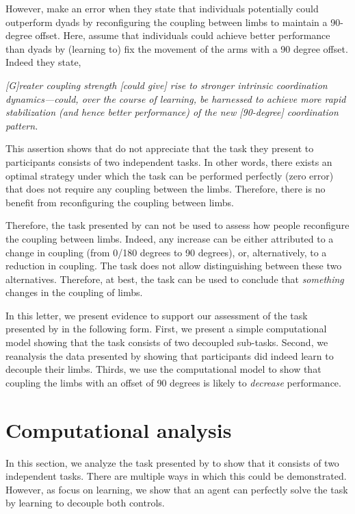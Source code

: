\documentclass[]{article}
\begin{document}
However, \citet{Annand2020} make an error when they state that individuals potentially could outperform dyads by reconfiguring the coupling between limbs to maintain a 90-degree offset. Here, \citet{Annand2020} assume that individuals could achieve better performance than dyads by (learning to) fix the movement of the arms with a 90 degree offset. Indeed they state,

\noindent\textit{[G]reater coupling strength [could give] rise to stronger intrinsic coordination dynamics—could, over the course of learning, be harnessed to achieve more rapid stabilization (and hence better performance) of the new [90-degree] coordination pattern.}

This assertion shows that \citet{Annand2020} do not appreciate that the task they present to participants consists of two independent tasks. In other words, there exists an optimal strategy under which the task can be performed perfectly (zero error) that does not require any coupling between the limbs. Therefore, there is no benefit from reconfiguring the coupling between limbs. 

Therefore, the task presented by \citet{Annand2020} can not be used to assess how people reconfigure the coupling between limbs. Indeed, any increase can be either attributed to a change in coupling (from 0/180 degrees to 90 degrees), or, alternatively, to a reduction in coupling. The task does not allow distinguishing between these two alternatives. Therefore, at best, the task can be used to conclude that \textit{something} changes in the coupling of limbs. 

In this letter, we present evidence to support our assessment of the task presented by \citet{Annand2020} in the following form. First, we present a simple computational model showing that the task consists of two decoupled sub-tasks. Second, we reanalysis the data presented by \citet{Annand2020} showing that participants did indeed learn to decouple their limbs. Thirds, we use the computational model to show that coupling the limbs with an offset of 90 degrees is likely to \textit{decrease} performance.

\section{Computational analysis}

In this section, we analyze the task presented by \citet{Annand2020} to show that it consists of two independent tasks. There are multiple ways in which this could be demonstrated. However, as \citet{Annand2020} focus on learning, we show that an agent can perfectly solve the task by learning to decouple both controls.





    



\end{document}
